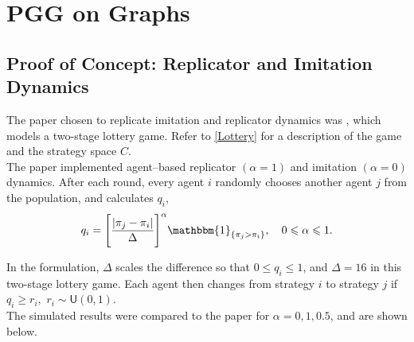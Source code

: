 \section{PGG on Graphs}
\subsection{Proof of Concept: Replicator and Imitation Dynamics}

The paper chosen to replicate imitation and replicator dynamics was \cite{RN30}, which models a two-stage lottery game. Refer to \ref{Lottery} for a description of the game and the strategy space $C$. \\

The paper implemented agent--based replicator $(\alpha = 1)$ and imitation $(\alpha = 0)$ dynamics. After each round, every agent $i$ randomly chooses another agent $j$ from the population, and calculates $q_i$, \\

$$q_i = \Bigg[ \frac{|\pi_j - \pi_i|}{\Delta} \Bigg]^\alpha \mathbbm{1}_{\{\pi_j>\pi_i\}}, \quad  0 \leq \alpha \leq 1.$$

In the formulation, $\Delta$ scales the difference so that $0 \leq q_i \leq 1$, and $\Delta = 16$ in this two-stage lottery game. Each agent then changes from strategy $i$ to strategy $j$ if $q_i \geq r_i,$ $r_i \sim \mathsf{U}(0,1)$. \\

The simulated results were compared to the paper for $\alpha = 0, 1, 0.5$, and are shown below. \\

